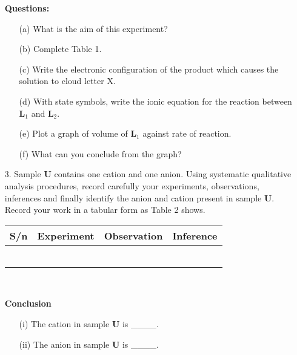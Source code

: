 \begin{enumerate}
\textbf{Questions:}\\
\begin{enumerate}
\item[(a)] What is the aim of this experiment?
\item[(b)] Complete Table 1.
\item[(c)] Write the electronic configuration of the product which causes the solution to cloud letter X.
\item[(d)] With state symbols, write the ionic equation for the reaction between \textbf{L$_1$} and \textbf{L$_2$}.
\item[(e)] Plot a graph of volume of \textbf{L$_1$} against rate of reaction.
\item[(f)] What can you conclude from the graph?\\
\end{enumerate}

\item[3.] Sample \textbf{U} contains one cation and one anion. Using systematic qualitative analysis procedures, record carefully your experiments, observations, inferences and finally identify the anion and cation present in sample \textbf{U}. Record your work in a tabular form as Table 2 shows.\\

\begin{center}
\begin{tabular}{|p{1cm}|p{5cm}|p{3cm}|p{3cm}|}
\hline
\textbf{S/n}&\textbf{Experiment}&\textbf{Observation}&\textbf{Inference}\\ \hline
&&&\\
&&&\\
&&&\\
&&&\\
&&&\\
&&&\\
\hline
\end{tabular}\\
\end{center}

\textbf{Conclusion}\\
\begin{enumerate}
\item[(i)] The cation in sample \textbf{U} is \_\_\_\_.\\
\item[(ii)] The anion in sample \textbf{U} is \_\_\_\_.\\
\end{enumerate}

\end{enumerate}